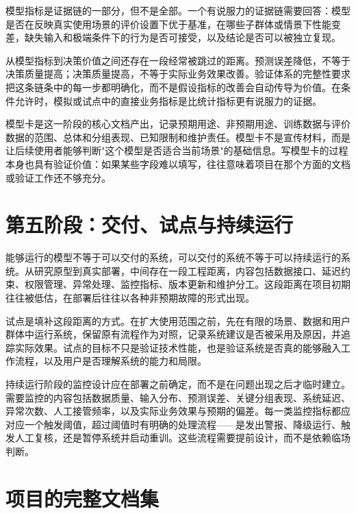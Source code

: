 模型指标是证据链的一部分，但不是全部。一个有说服力的证据链需要回答：模型是否在反映真实使用场景的评价设置下优于基准，在哪些子群体或情景下性能变差，缺失输入和极端条件下的行为是否可接受，以及结论是否可以被独立复现。

从模型指标到决策价值之间还存在一段经常被跳过的距离。预测误差降低，不等于决策质量提高；决策质量提高，不等于实际业务效果改善。验证体系的完整性要求把这条链条中的每一步都明确化，而不是假设指标的改善会自动传导为价值。在条件允许时，模拟或试点中的直接业务指标是比统计指标更有说服力的证据。

模型卡是这一阶段的核心文档产出，记录预期用途、非预期用途、训练数据与评价数据的范围、总体和分组表现、已知限制和维护责任\cite{mitchell2019model}。模型卡不是宣传材料，而是让后续使用者能够判断"这个模型是否适合当前场景"的基础信息。写模型卡的过程本身也具有验证价值：如果某些字段难以填写，往往意味着项目在那个方面的文档或验证工作还不够充分。

\section{第五阶段：交付、试点与持续运行}

能够运行的模型不等于可以交付的系统，可以交付的系统不等于可以持续运行的系统。从研究原型到真实部署，中间存在一段工程距离，内容包括数据接口、延迟约束、权限管理、异常处理、监控指标、版本更新和维护分工。这段距离在项目初期往往被低估，在部署后往往以各种非预期故障的形式出现。

试点是填补这段距离的方式。在扩大使用范围之前，先在有限的场景、数据和用户群体中运行系统，保留原有流程作为对照，记录系统建议是否被采用及原因，并追踪实际效果。试点的目标不只是验证技术性能，也是验证系统是否真的能够融入工作流程，以及用户是否理解系统的能力和局限。

持续运行阶段的监控设计应在部署之前确定，而不是在问题出现之后才临时建立。需要监控的内容包括数据质量、输入分布、预测误差、关键分组表现、系统延迟、异常次数、人工接管频率，以及实际业务效果与预期的偏差。每一类监控指标都应对应一个触发阈值，超过阈值时有明确的处理流程——是发出警报、降级运行、触发人工复核，还是暂停系统并启动重训。这些流程需要提前设计，而不是依赖临场判断。

\section{项目的完整文档集}

